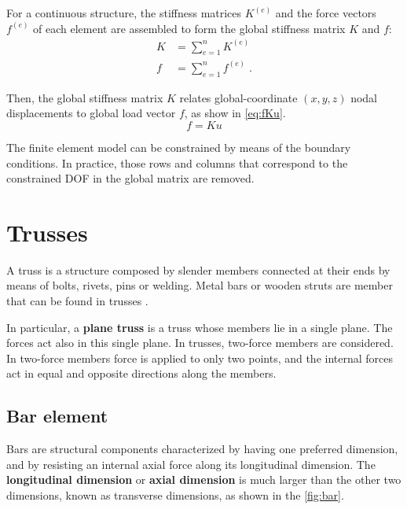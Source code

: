 For a continuous structure, the stiffness matrices $K^{(e)}$ and the force vectors $f^{(e)}$ of each element are assembled to form the global stiffness matrix $K$ and $f$: 
%
\begin{align}
    K &= \sum_{e=1}^n K^{(e)}\\
    f &= \sum_{e=1}^n f^{(e)} \;.
\end{align}
%

Then, the global stiffness matrix $K$ relates global-coordinate $(x,y,z)$ nodal displacements to global load vector $f$, as show in \autoref{eq:fKu}.
%
\begin{equation}
\label{eq:fKu}
    f = K u
\end{equation}

The finite element model can be constrained by means of the boundary conditions. In practice, those rows and columns that correspond to the constrained DOF in the global matrix are removed.

\section{Trusses}

A truss is a structure composed by slender members connected at their ends by means of bolts, rivets, pins or welding. Metal bars or wooden struts are member that can be found in trusses \cite{moaveni2008finite,hibbeler2010engineering}.


In particular, a \textbf{plane truss} is a truss whose members lie in a single plane. The forces act also in this single plane. In trusses, two-force members are considered. In two-force members force is applied to only two points, and the internal forces act in equal and opposite directions along the members.

\subsection{Bar element}

Bars are structural components characterized by having one preferred dimension, and by resisting an internal axial force along its longitudinal dimension. The \textbf{longitudinal dimension} or \textbf{axial dimension} is much larger than the other two dimensions, known as transverse dimensions, as shown in the \autoref{fig:bar}.

